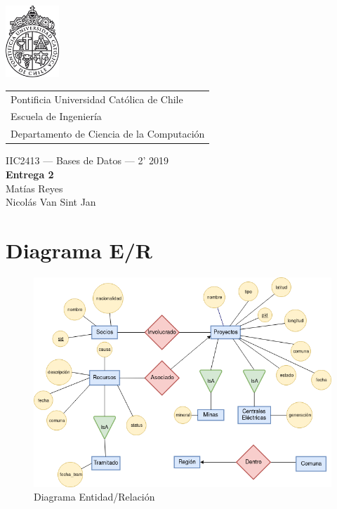\documentclass{article}
\begin{document}
\includegraphics[width=2cm]{uc.png}
\vspace*{-1.9cm}

\hspace*{2.1cm}
 \begin{tabular}{l}
  \sc Pontificia Universidad Católica de Chile \\
  \sc Escuela de Ingeniería \\
  \sc Departamento de Ciencia de la Computación
 \end{tabular}
 \bigskip

\vspace*{5mm}
\begin{center}
{IIC2413 --- Bases de Datos --- 2' 2019} \\
\vspace{3mm}
{\Large\bf Entrega 2} \\
\vspace{2mm}
Matías Reyes \\
Nicolás Van Sint Jan
\end{center}

\section{Diagrama E/R}

\begin{figure}[h]	
	\includegraphics[width=\textwidth]{ER_v1.png}
	\caption{Diagrama Entidad/Relación}
\end{figure}
\end{document}
